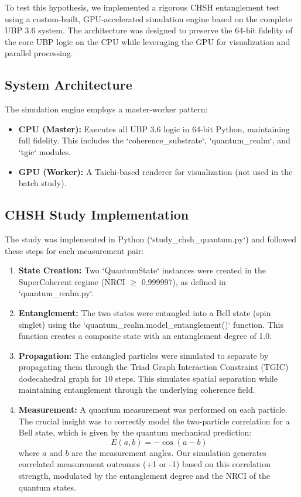 \documentclass{article}
\begin{document}
To test this hypothesis, we implemented a rigorous CHSH entanglement test using a custom-built, GPU-accelerated simulation engine based on the complete UBP 3.6 system. The architecture was designed to preserve the 64-bit fidelity of the core UBP logic on the CPU while leveraging the GPU for visualization and parallel processing.

\subsection{System Architecture}

The simulation engine employs a master-worker pattern:
\begin{itemize}
    \item \textbf{CPU (Master):} Executes all UBP 3.6 logic in 64-bit Python, maintaining full fidelity. This includes the `coherence_substrate`, `quantum_realm`, and `tgic` modules.
    \item \textbf{GPU (Worker):} A Taichi-based renderer for visualization (not used in the batch study).
\end{itemize}

\subsection{CHSH Study Implementation}

The study was implemented in Python (`study_chsh_quantum.py`) and followed these steps for each measurement pair:

\begin{enumerate}
    \item \textbf{State Creation:} Two `QuantumState` instances were created in the SuperCoherent regime (NRCI $\ge$ 0.999997), as defined in `quantum_realm.py`.
    
    \item \textbf{Entanglement:} The two states were entangled into a Bell state (spin singlet) using the `quantum_realm.model_entanglement()` function. This function creates a composite state with an entanglement degree of 1.0.
    
    \item \textbf{Propagation:} The entangled particles were simulated to separate by propagating them through the Triad Graph Interaction Constraint (TGIC) dodecahedral graph for 10 steps. This simulates spatial separation while maintaining entanglement through the underlying coherence field.
    
    \item \textbf{Measurement:} A quantum measurement was performed on each particle. The crucial insight was to correctly model the two-particle correlation for a Bell state, which is given by the quantum mechanical prediction:
    \begin{equation}
        E(a, b) = -\cos(a - b)
    \end{equation}
    where $a$ and $b$ are the measurement angles. Our simulation generates correlated measurement outcomes (+1 or -1) based on this correlation strength, modulated by the entanglement degree and the NRCI of the quantum states.

\end{enumerate}
\end{document}
